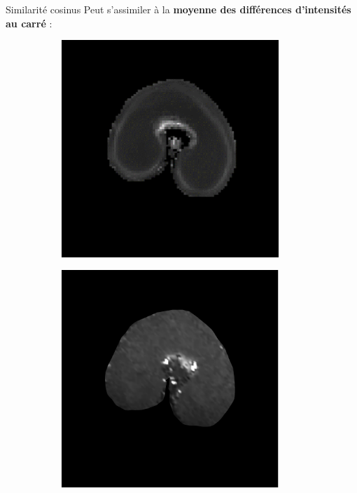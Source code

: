 \documentclass[10pt]{beamer}
\begin{document}
\begin{frame}{Similarité cosinus}
  Peut s'assimiler à la \textbf{moyenne des différences d'intensités au carré} :

   \begin{figure}[ht]
    \centering
    \begin{subfigure}[t]{0.33\textwidth}
      \centering
      \includegraphics[width=0.9\textwidth]{fig/mri_slice8_250}
      \caption{}
      \label{subfig:mri_slice8_250}
    \end{subfigure}%
    \begin{subfigure}[t]{0.33\textwidth}
      \centering
      \includegraphics[width=0.9\textwidth]{fig/zonetir_2}%

\end{subfigure}
\end{figure}
\end{frame}
\end{document}
